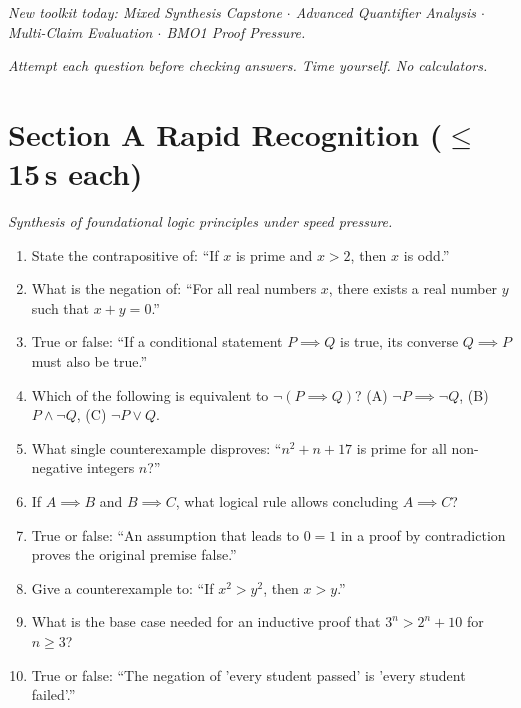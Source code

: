\documentclass[11pt,a4paper]{article}
\begin{document}
\noindent\textit{New toolkit today: Mixed Synthesis Capstone $\cdot$ Advanced Quantifier Analysis $\cdot$ Multi-Claim Evaluation $\cdot$ BMO1 Proof Pressure.}

\vspace{2pt}
\noindent\textit{Attempt each question before checking answers. Time yourself. No calculators.}

\section*{Section A \quad Rapid Recognition \hfill{\normalfont\small($\leq$15\,s each)}}

\noindent\textit{Synthesis of foundational logic principles under speed pressure.}

\begin{enumerate}

\item State the contrapositive of: ``If $x$ is prime and $x > 2$, then $x$ is odd.''

\item What is the negation of: ``For all real numbers $x$, there exists a real number $y$ such that $x+y=0$.''

\item True or false: ``If a conditional statement $P \implies Q$ is true, its converse $Q \implies P$ must also be true.''

\item Which of the following is equivalent to $\neg(P \implies Q)$? (A) $\neg P \implies \neg Q$, (B) $P \land \neg Q$, (C) $\neg P \lor Q$.

\item What single counterexample disproves: ``$n^2+n+17$ is prime for all non-negative integers $n$?''

\item If $A \implies B$ and $B \implies C$, what logical rule allows concluding $A \implies C$?

\item True or false: ``An assumption that leads to $0=1$ in a proof by contradiction proves the original premise false.''

\item Give a counterexample to: ``If $x^2 > y^2$, then $x > y$.''

\item What is the base case needed for an inductive proof that $3^n > 2^n + 10$ for $n \ge 3$?

\item True or false: ``The negation of 'every student passed' is 'every student failed'.''

\end{enumerate}
\end{document}
